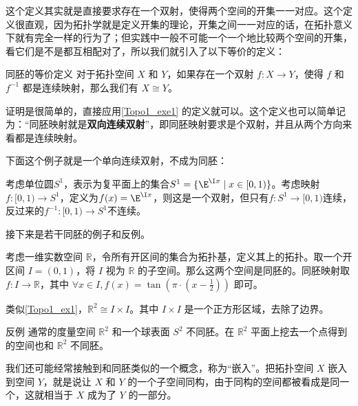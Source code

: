 这个定义其实就是直接要求存在一个双射，使得两个空间的开集一一对应。这个定义很直观，因为拓扑学就是定义开集的理论，开集之间一一对应的话，在拓扑意义下就有完全一样的行为了；但实践中一般不可能一个一个地比较两个空间的开集，看它们是不是都互相配对了，所以我们就引入了以下等价的定义：

\begin{theorem}{同胚的等价定义}\label{Topo1_the1}
对于拓扑空间 $X$ 和 $Y$，如果存在一个双射 $f:X\rightarrow Y$，使得 $f$ 和 $f^{-1}$ 都是连续映射，那么我们有 $X\cong Y$。
\end{theorem}

证明是很简单的，直接应用\autoref{Topo1_exe1} 的定义就可以。这个定义也可以简单记为：“同胚映射就是\textbf{双向连续双射}”，即同胚映射要求是个双射，并且从两个方向来看都是连续映射。

下面这个例子就是一个单向连续双射，不成为同胚：

\begin{example}{}

考虑单位圆$S^1$，表示为复平面上的集合$S^1=\{\E^{\I x}\mid x\in[0, 1)\}$。考虑映射$f:[0, 1)\to S^1$，定义为$f(x)=\E^{\I x}$，则这是一个双射，但只有$f:S^1\to[0, 1)$连续，反过来的$f^{-1}:[0, 1)\to S^1$不连续。

\end{example}

接下来是若干同胚的例子和反例。

\begin{example}{}\label{Topo1_ex1}
考虑一维实数空间 $\mathbb{R}$，令所有开区间的集合为拓扑基，定义其上的拓扑。取一个开区间 $I=(0, 1)$，将 $I$ 视为 $\mathbb{R}$ 的子空间。那么这两个空间是同胚的。同胚映射取 $f:I\rightarrow\mathbb{R}$，其中 $\forall x\in I, f(x)=\tan{(\pi\cdot(x-\frac{1}{2}))}$ 即可。
\end{example}

\begin{example}{}\label{Topo1_ex2}
类似\autoref{Topo1_ex1}，$\mathbb{R}^2\cong I\times I$。其中 $I\times I$ 是一个正方形区域，去除了边界。
\end{example}

\begin{example}{反例}\label{Topo1_ex3}
通常的度量空间 $\mathbb{R}^2$ 和一个球表面 $S^2$ 不同胚。在 $\mathbb{R}^2$ 平面上挖去一个点得到的空间也和 $\mathbb{R}^2$ 不同胚。
\end{example}

我们还可能经常接触到和同胚类似的一个概念，称为“嵌入”。把拓扑空间 $X$ 嵌入到空间 $Y$，就是说让 $X$ 和 $Y$ 的一个子空间同构，由于同构的空间都被看成是同一个，这就相当于 $X$ 成为了 $Y$ 的一部分。

